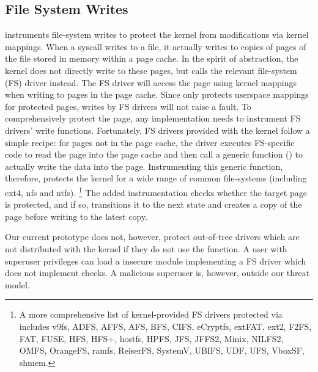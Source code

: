 \subsection{File System Writes}

\midas instruments file-system writes to protect the kernel
from modifications via kernel mappings.
When a  syscall writes to a file, it actually
writes to copies of pages of the file stored in memory within
a page cache.
In the spirit of abstraction, the kernel does not directly write to
these pages, but calls the relevant file-system (FS) driver instead.
The FS driver will access the page using kernel mappings when writing to pages in the page cache.
Since \midas only protects userspace mappings for protected pages,
writes by FS drivers will not raise a fault.
To comprehensively protect the page, any implementation needs to
instrument FS drivers' write functions.
Fortunately, FS drivers provided with the kernel follow a simple
recipe: for pages not in the page cache, the driver executes
FS-specific code to read the page into the page cache and then
call a generic function () to actually
write the data into the page.
Instrumenting this generic function, therefore, protects the kernel
for a wide range of common file-systems (including ext4, nfs and
ntfs). \footnote{A more comprehensive list of kernel-provided FS drivers
protected via  includes v9fs, ADFS, AFFS,
AFS, BFS, CIFS, eCryptfs, extFAT, ext2, F2FS,  FAT, FUSE, HFS, HFS+,
hostfs, HPFS, JFS, JFFS2, Minix, NILFS2, OMFS, OrangeFS, ramfs, ReiserFS,
SystemV, UBIFS, UDF, UFS, VboxSF, shmem.}
The added instrumentation checks whether the target page is
protected, and if so, transitions it to the next state and
creates a copy of the page before writing to the latest copy.

Our current prototype does not, however, protect out-of-tree drivers
which are not distributed with the kernel if they do not use the
 function.
A user with superuser privileges can load a insecure module implementing a
FS driver which does not implement \midas checks.
A malicious superuser is, however, outside our threat model.
%


